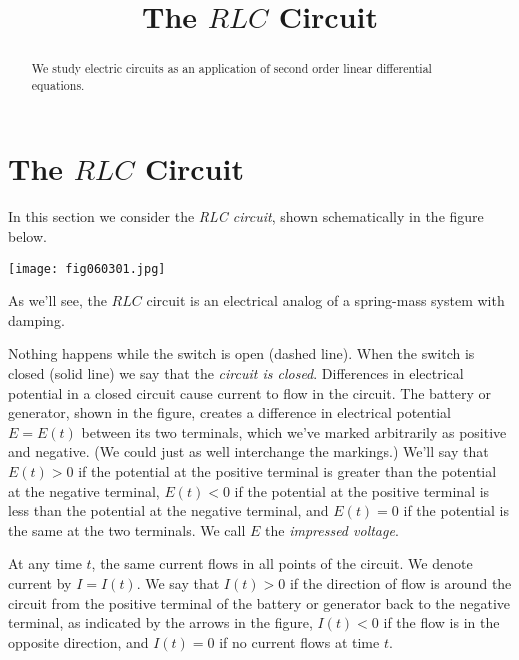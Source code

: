 \documentclass{ximera}
\title{The $RLC$ Circuit}
\begin{document}
\begin{abstract}
We study electric circuits as an application of second order linear differential equations.
\end{abstract}

\maketitle

\section*{The $RLC$ Circuit}

In this section we consider the \textit{RLC circuit}, shown
schematically in the figure below. 

\begin{image}
  \texttt{[image: fig060301.jpg]} 
\end{image}

As we'll see, the $RLC$
circuit is an electrical analog of a spring-mass system with
damping.

Nothing happens while the switch is open (dashed line). When the
switch is closed (solid line) we say that the \textit{circuit is closed}. Differences in electrical potential in a closed circuit
cause current to flow in the circuit. The battery or generator, shown in the figure,
 creates a difference in electrical potential
$E=E(t)$ between its two terminals, which we've marked arbitrarily as
positive and negative. (We could just as well interchange the
markings.) We'll say that $E(t)>0$ if the potential at the positive
terminal is greater than the potential at the negative terminal,
$E(t)<0$ if the potential at the positive terminal is less than the
potential at the negative terminal, and $E(t)=0$ if the potential is
the same at the two terminals. We call $E$ the \textit{impressed
voltage}.

At any  time $t$, the same current flows in all points of the
circuit. We denote current by $I=I(t)$. We say that $I(t)>0$ if the
direction of flow is around the circuit from the positive terminal of
the battery or generator back to the negative terminal, as indicated
by the arrows in the figure,   $I(t)<0$ if the flow is in the
opposite direction, and $I(t)=0$ if no current flows at time $t$.
\end{document}
